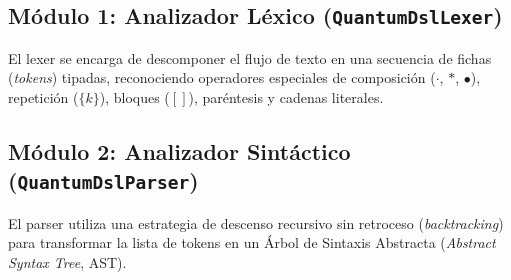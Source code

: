 \documentclass[11pt,a4paper]{article}
\begin{document}
\subsection{Módulo 1: Analizador Léxico (\texttt{QuantumDslLexer})}
El lexer se encarga de descomponer el flujo de texto en una secuencia de fichas (\textit{tokens}) tipadas, reconociendo operadores especiales de composición ($\cdot$, $*$, $\bullet$), repetición ($\{k\}$), bloques ($[ ]$), paréntesis y cadenas literales.

\begin{table}[H]
\centering
\caption{Tokens principales procesados por el QuantumDslLexer.}
\label{tab:tokens_dsl}
\end{table}

\subsection{Módulo 2: Analizador Sintáctico (\texttt{QuantumDslParser})}
El parser utiliza una estrategia de descenso recursivo sin retroceso (\textit{backtracking}) para transformar la lista de tokens en un Árbol de Sintaxis Abstracta (\textit{Abstract Syntax Tree}, AST).
\end{document}
